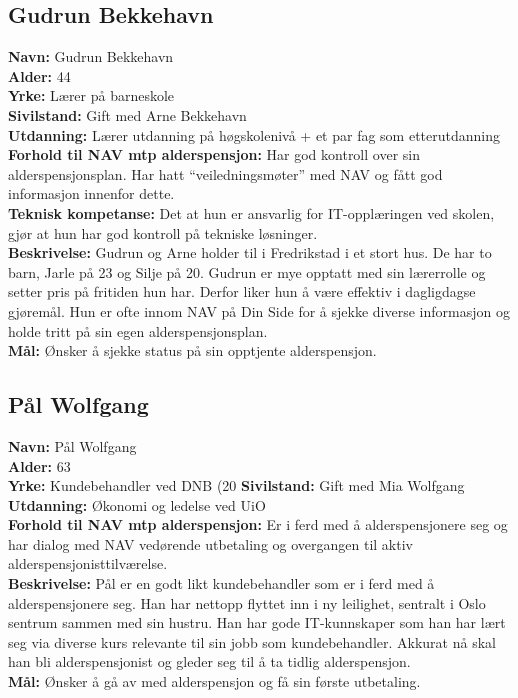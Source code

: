 \documentclass[informationsecurity]{gucmasterproject}
\begin{document}
\subsection{Gudrun Bekkehavn}
\textbf{Navn:} Gudrun Bekkehavn \\
\textbf{Alder:} 44 \\
\textbf{Yrke:} Lærer på barneskole \\
\textbf{Sivilstand:} Gift med Arne Bekkehavn \\
\textbf{Utdanning:} Lærer utdanning på høgskolenivå + et par fag som etterutdanning \\
\textbf{Forhold til NAV mtp alderspensjon:} Har god kontroll over sin alderspensjonsplan. Har hatt “veiledningsmøter” med NAV og fått god informasjon innenfor dette.  \\
\textbf{Teknisk kompetanse:} Det at hun er ansvarlig for IT-opplæringen ved skolen, gjør at hun har god kontroll på tekniske løsninger.  \\
\textbf{Beskrivelse:} Gudrun og Arne holder til i Fredrikstad i et stort hus. De har to barn, Jarle på 23 og Silje på 20. Gudrun er mye opptatt med sin lærerrolle og setter pris på fritiden hun har. Derfor liker hun å være effektiv i dagligdagse gjøremål.  Hun er ofte innom NAV på Din Side for å sjekke diverse informasjon og holde tritt på sin egen alderspensjonsplan.  \\
\textbf{Mål:} Ønsker å sjekke status på sin opptjente alderspensjon. 


\subsection{Pål Wolfgang}
\textbf{Navn:} Pål Wolfgang \\
\textbf{Alder:} 63 \\
\textbf{Yrke:} Kundebehandler ved DNB (20%
\textbf{Sivilstand:} Gift med Mia Wolfgang \\
\textbf{Utdanning:} Økonomi og ledelse ved UiO \\
\textbf{Forhold til NAV mtp alderspensjon:} Er i ferd med å alderspensjonere seg og har dialog med NAV vedørende utbetaling og overgangen til aktiv alderspensjonisttilværelse. \\
\textbf{Beskrivelse:} Pål er en godt likt kundebehandler som er i ferd med å alderspensjonere seg. Han har nettopp flyttet inn i ny leilighet, sentralt i Oslo sentrum sammen med sin hustru. Han har gode IT-kunnskaper som han har lært seg via diverse kurs relevante til sin jobb som kundebehandler. Akkurat nå skal han bli alderspensjonist og gleder seg til å ta tidlig alderspensjon.  \\
\textbf{Mål:} Ønsker å gå av med alderspensjon og få sin første utbetaling.
\end{document}
